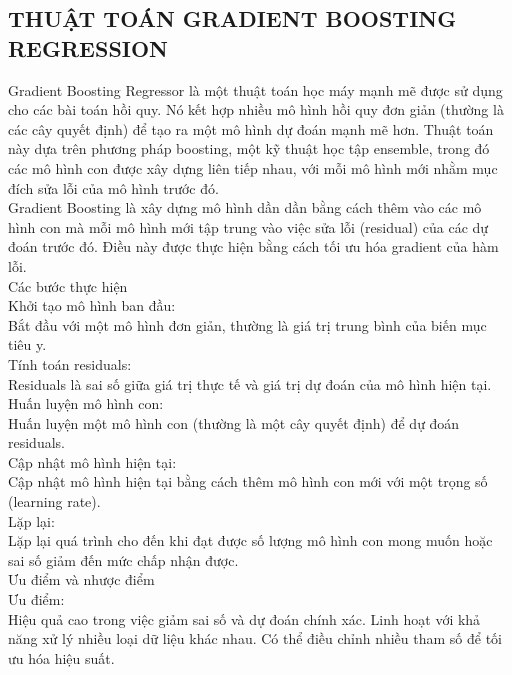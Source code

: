\documentclass[conference]{IEEEtran}
\begin{document}
       \subsection{THUẬT TOÁN GRADIENT BOOSTING REGRESSION}
       Gradient Boosting Regressor là một thuật toán học máy mạnh mẽ được sử dụng cho các bài toán hồi quy. Nó kết hợp nhiều mô hình hồi quy đơn giản (thường là các cây quyết định) để tạo ra một mô hình dự đoán mạnh mẽ hơn. Thuật toán này dựa trên phương pháp boosting, một kỹ thuật học tập ensemble, trong đó các mô hình con được xây dựng liên tiếp nhau, với mỗi mô hình mới nhằm mục đích sửa lỗi của mô hình trước đó.\\
       Gradient Boosting là xây dựng mô hình dần dần bằng cách thêm vào các mô hình con mà mỗi mô hình mới tập trung vào việc sửa lỗi (residual) của các dự đoán trước đó. Điều này được thực hiện bằng cách tối ưu hóa gradient của hàm lỗi.\\
       Các bước thực hiện\\
       
       Khởi tạo mô hình ban đầu:\\
       Bắt đầu với một mô hình đơn giản, thường là giá trị trung bình của biến mục tiêu y.\\
       
       Tính toán residuals:\\
       Residuals là sai số giữa giá trị thực tế và giá trị dự đoán của mô hình hiện tại.\\
       
       Huấn luyện mô hình con:\\
       Huấn luyện một mô hình con (thường là một cây quyết định) để dự đoán residuals.\\
       
       Cập nhật mô hình hiện tại:\\
       Cập nhật mô hình hiện tại bằng cách thêm mô hình con mới với một trọng số (learning rate).\\
       
       Lặp lại:\\
       Lặp lại quá trình cho đến khi đạt được số lượng mô hình con mong muốn hoặc sai số giảm đến mức chấp nhận được.\\
       
       Ưu điểm và nhược điểm\\
       
       Ưu điểm:\\
       Hiệu quả cao trong việc giảm sai số và dự đoán chính xác.
       Linh hoạt với khả năng xử lý nhiều loại dữ liệu khác nhau.
       Có thể điều chỉnh nhiều tham số để tối ưu hóa hiệu suất.\\
       
\end{document}
